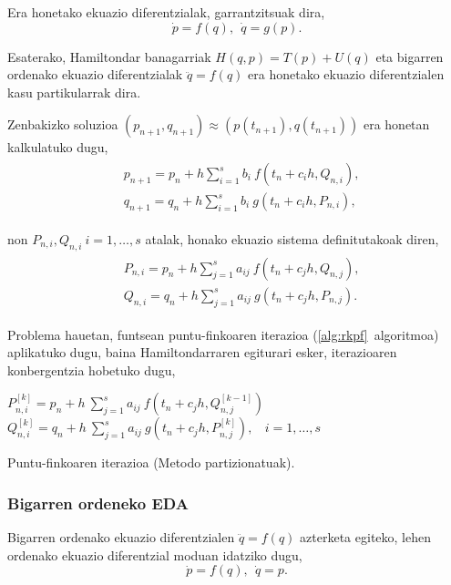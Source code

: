 Era honetako ekuazio diferentzialak, garrantzitsuak dira,
\begin{equation*}
\dot{p}=f(q), \ \ \dot{q}=g(p).
\end{equation*}

Esaterako, Hamiltondar banagarriak $H(q,p)=T(p)+U(q)$ eta bigarren ordenako ekuazio diferentzialak $\ddot{q}=f(q)$ era honetako ekuazio diferentzialen kasu partikularrak dira.

Zenbakizko soluzioa $(p_{n+1},q_{n+1}) \approx (p(t_{n+1}),q(t_{n+1}))$ era honetan kalkulatuko dugu,
\begin{align}
\begin{split}
&p_{n+1}=p_n+ h \sum\limits_{i=1}^{s} b_i \ f(t_n+c_ih,Q_{n,i}),\\
&q_{n+1}=q_n+ h \sum\limits_{i=1}^{s} b_i \ g(t_n+c_ih,P_{n,i}),
\end{split}
\end{align}

non $P_{n,i},Q_{n,i} \ i=1,\dots,s$ atalak, honako ekuazio sistema definitutakoak diren, 
\begin{align}
\begin{split}
&P_{n,i} =p_n+ h \sum\limits_{j=1}^{s} a_{ij} \ f(t_n+c_jh,Q_{n,j}), \\
&Q_{n,i} =q_n+ h \sum\limits_{j=1}^{s} a_{ij} \ g(t_n+c_jh,P_{n,j}).
\end{split}
\end{align}

Problema hauetan,  funtsean puntu-finkoaren iterazioa (\ref{alg:rkpf}~algoritmoa) aplikatuko dugu, baina Hamiltondarraren egiturari esker, iterazioaren konbergentzia hobetuko dugu,   

\begin{algorithm}[H]
  {
  \BlankLine
   $P_{n,i}^{[k]}=p_{n}+ h \ \sum\limits_{j=1}^{s} a_{ij} \ f(t_n+c_jh,Q_{n,j}^{[k-1]})$\; 
   $Q_{n,i}^{[k]}=q_{n}+ h \ \sum\limits_{j=1}^{s} a_{ij} \ g(t_n+c_jh,P_{n,j}^{[k]}), \ \ \ \ i=1,\dots,s $\; 
  }
 \caption{Puntu-finkoaren iterazioa (Metodo partizionatuak).}
 \label{alg:rkfppart}
\end{algorithm}


\subsubsection*{Bigarren ordeneko EDA}

Bigarren ordenako ekuazio diferentzialen $\ddot{q}=f(q)$ azterketa egiteko, lehen ordenako ekuazio diferentzial moduan idatziko dugu,
\begin{equation*}
\dot{p}=f(q), \ \ \dot{q}=p.
\end{equation*}

